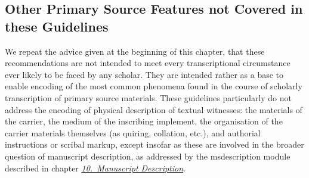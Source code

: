 \subsection[{Other Primary Source Features not Covered in these Guidelines}]{Other Primary Source Features not Covered in these Guidelines}\label{PHTRXX}\par
We repeat the advice given at the beginning of this chapter, that these recommendations are not intended to meet every transcriptional circumstance ever likely to be faced by any scholar. They are intended rather as a base to enable encoding of the most common phenomena found in the course of scholarly transcription of primary source materials. These guidelines particularly do not address the encoding of physical description of textual witnesses: the materials of the carrier, the medium of the inscribing implement, the organisation of the carrier materials themselves (as quiring, collation, etc.), and authorial instructions or scribal markup, except insofar as these are involved in the broader question of manuscript description, as addressed by the \textsf{msdescription} module described in chapter \textit{\hyperref[MS]{10.\ Manuscript Description}}.
